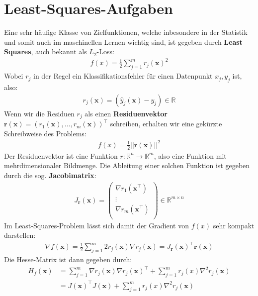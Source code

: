 \documentclass{report}
\newcommand{\tbf}{\textbf}
\newcommand{\Jrx}{J_{\bm{r}}(\bm{x})}
\begin{document}
\section{Least-Squares-Aufgaben}
Eine sehr häufige Klasse von Zielfunktionen, welche inbesondere in der Statistik und somit auch im maschinellen Lernen wichtig sind, ist gegeben durch \tbf{Least Squares}, auch bekannt als $L_2$-Loss:
\begin{align*}
 f(x) = \frac{1}{2}\sum_{j=1}^m r_j(\bm{x})^2
\end{align*}
Wobei $r_j$ in der Regel ein Klassifikationsfehler für einen Datenpunkt $x_j, y_j$ ist, also:
\begin{align*}
 r_j(\bm{x}) = (\hat{y}_j(\bm{x}) - y_j) \in \mathbb{R}
\end{align*}
Wenn wir die Residuen $r_j$ als einen \tbf{Residuenvektor} $\bm{r}(\bm{x}) = (r_1(\bm{x}), \hdots, r_m(\bm{x}))^\top$ schreiben, erhalten wir eine gekürzte Schreibweise des Problems:
\begin{align*}
 f(x) = \frac{1}{2}||\bm{r}(\bm{x})||^2
\end{align*}
Der Residuenvektor ist eine Funktion $r: \mathbb{R}^n \to \mathbb{R}^m$, also eine Funktion mit mehrdimensionaler Bildmenge. Die Ableitung einer solchen Funktion ist gegeben durch die sog. \tbf{Jacobimatrix}:
\begin{align*}
\Jrx = \begin{pmatrix}
        \nabla r_1(\bm{x}^\top)\\
        \vdots\\
        \nabla r_m(\bm{x}^\top)\\
       \end{pmatrix}
       \in \mathbb{R}^{m \times n}
\end{align*}
Im Least-Squares-Problem lässt sich damit der Gradient von $f(x)$ sehr kompakt darstellen:
\begin{align*}
 \nabla f(\bm{x}) = \frac{1}{2}\sum_{j=1}^m 2 r_j(\bm{x}) \nabla r_j(\bm{x}) = \Jrx^\top \bm{r(x)}
\end{align*}
Die Hesse-Matrix ist dann gegeben durch:
\begin{align*}
 H_f(\bm{x}) &= \sum_{j=1}^m \nabla r_j(\bm{x}) \nabla r_j(\bm{x})^\top + \sum_{j=1}^m r_j(x) \nabla^2 r_j(\bm{x})\\
 &= J(\bm{x})^\top J(\bm{x}) + \sum_{j=1}^m r_j(x) \nabla^2 r_j(\bm{x})
\end{align*}
\end{document}
